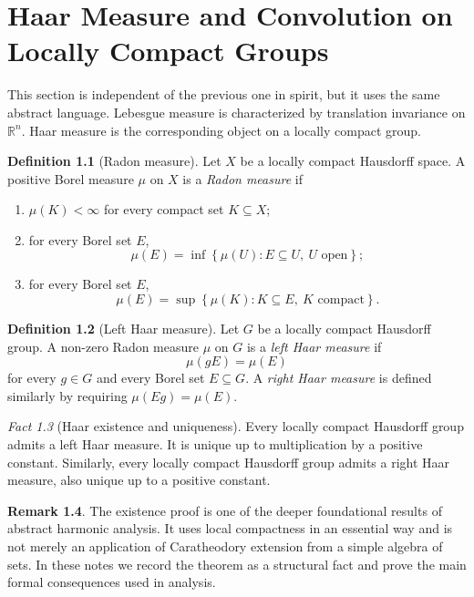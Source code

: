 \documentclass[11pt,openany]{book}
\numberwithin{equation}{chapter}
\theoremstyle{definition}
\newtheorem{definition}{Definition}[chapter]
\newtheorem{remark}[definition]{Remark}
\theoremstyle{plain}
\theoremstyle{remark}
\newtheorem{fact}[definition]{Fact}
\newcommand{\R}{\mathbb{R}}
\newcommand{\1}{\mathbf{1}}
\newcommand{\set}[1]{\left\{#1\right\}}
\begin{document}
\appendix
\chapter{Haar Measure and Convolution on Locally Compact Groups}\label{app:haar-measure}

This section is independent of the previous one in spirit, but it uses the same abstract language.  Lebesgue measure is characterized by translation invariance on \(\R^n\). Haar measure is the corresponding object on a locally compact group.

\begin{definition}[Radon measure]
Let \(X\) be a locally compact Hausdorff space. A positive Borel measure \(\mu\) on \(X\) is a \emph{Radon measure} if
\begin{enumerate}[label=\textup{(\roman*)}]
  \item \(\mu(K)<\infty\) for every compact set \(K\subseteq X\);
  \item for every Borel set \(E\),
  \[
    \mu(E)=\inf\set{\mu(U): E\subseteq U,\ U\text{ open}};
  \]
  \item for every Borel set \(E\),
  \[
    \mu(E)=\sup\set{\mu(K): K\subseteq E,\ K\text{ compact}}.
  \]
\end{enumerate}
\end{definition}

\begin{definition}[Left Haar measure]
Let \(G\) be a locally compact Hausdorff group. A non-zero Radon measure \(\mu\) on \(G\) is a \emph{left Haar measure} if
\[
  \mu(gE)=\mu(E)
\]
for every \(g\in G\) and every Borel set \(E\subseteq G\). A \emph{right Haar measure} is defined similarly by requiring \(\mu(Eg)=\mu(E)\).
\end{definition}

\begin{fact}[Haar existence and uniqueness]
Every locally compact Hausdorff group admits a left Haar measure. It is unique up to multiplication by a positive constant. Similarly, every locally compact Hausdorff group admits a right Haar measure, also unique up to a positive constant.
\end{fact}

\begin{remark}
The existence proof is one of the deeper foundational results of abstract harmonic analysis. It uses local compactness in an essential way and is not merely an application of Caratheodory extension from a simple algebra of sets. In these notes we record the theorem as a structural fact and prove the main formal consequences used in analysis.
\end{remark}
\end{document}
